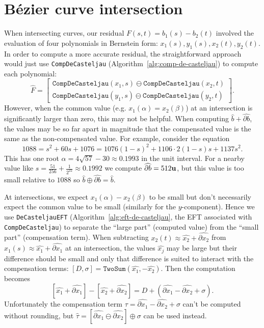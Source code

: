 \section{B\'{e}zier curve intersection}\label{sec:compensated-curve-intersect}

When intersecting curves, our residual \(F(s, t) = b_1(s) - b_2(t)\) involved
the evaluation of four polynomials in Bernstein form: \(x_1(s), y_1(s),
x_2(t), y_2(t)\). In order to compute a more accurate residual, the
straightforward approach would just use \texttt{CompDeCasteljau}
(Algorithm~\ref{alg:comp-de-casteljau}) to compute each
polynomial:
\begin{equation}
\widehat{F} = \left[ \begin{array}{c}
  \mathtt{CompDeCasteljau}(x_1, s) \ominus \mathtt{CompDeCasteljau}(x_2, t) \\
  \mathtt{CompDeCasteljau}(y_1, s) \ominus \mathtt{CompDeCasteljau}(y_2, t)
  \end{array}\right].
\end{equation}
However, when the common value (e.g. \(x_1(\alpha) = x_2(\beta)\)) at an
intersection is significantly larger than zero, this may not be helpful.
When computing \(\widehat{b} + \widehat{\partial b}\), the values may
be so far apart in magnitude that the compensated value is the same
as the non-compensated value. For example, consider the equation
\begin{equation}
1088 = s^2 + 60 s + 1076 = 1076 (1 - s)^2 + 1106 \cdot 2(1 - s)s + 1137s^2.
\end{equation}
This has one root \(\alpha = 4 \sqrt{57} - 30 \approx 0.1993\) in the unit
interval. For a nearby value like \(s = \frac{51}{256} + \frac{1}{2^{22}}
\approx 0.1992\) we compute \(\widehat{\partial b} = 512 \mathbf{u}\), but this
value is too small relative to \(1088\) so
\(\widehat{b} \oplus \widehat{\partial b} = \widehat{b}\).

At intersections, we expect \(x_1(\alpha) - x_2(\beta)\) to be small
but don't necessarily expect the common value to be small (similarly for
the \(y\)-component). Hence we use \texttt{DeCasteljauEFT}
(Algorithm~\ref{alg:eft-de-casteljau}, the EFT associated with
\texttt{CompDeCasteljau}) to separate the ``large part'' (computed value)
from the ``small part'' (compensation term).
When subtracting \(x_2(t) \approx \widehat{x_2} +
\widehat{\partial x_2}\) from \(x_1(s) \approx \widehat{x_1} +
\widehat{\partial x_1}\) at an intersection, the values \(\widehat{x_j}\) may
be large but their difference should be small and only that difference
is suited to interact with the compensation terms:
\(\left[D, \sigma\right] =
\mathtt{TwoSum}(\widehat{x_1}, -\widehat{x_2})\). Then the
computation becomes
\begin{equation}
\left[\widehat{x_1} + \widehat{\partial x_1}\right] -
\left[\widehat{x_2} + \widehat{\partial x_2}\right] =
D + \left(\widehat{\partial x_1} - \widehat{\partial x_2} + \sigma\right).
\end{equation}
Unfortunately the compensation term \(\tau = \widehat{\partial x_1} -
\widehat{\partial x_2} + \sigma\) can't be computed without rounding,
but \(\widehat{\tau} = \left[\widehat{\partial x_1} \ominus
\widehat{\partial x_2}\right] \oplus \sigma\) can be used instead.

